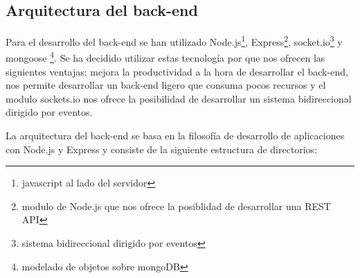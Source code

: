 \subsection{Arquitectura del back-end}


Para el desarrollo del back-end se han utilizado Node.js\footnote{javascript al lado del servidor}, Express\footnote{modulo de Node.js que nos ofrece la posiblidad de desarrollar una REST API}, socket.io\footnote{sistema bidireccional dirigido por eventos} y mongoose \footnote{modelado de objetos sobre mongoDB}. Se ha decidido utilizar estas tecnología por que nos ofrecen las siguientes ventajas: mejora la productividad a la hora de desarrollar el back-end, nos permite desarrollar un back-end ligero que consuma pocos recursos y el modulo sockets.io nos ofrece la posibilidad de desarrollar un sistema bidireccional dirigido por eventos.

La arquitectura del back-end se basa en la filosofía de desarrollo de aplicaciones con Node.js y Express y consiste de la siguiente estructura de directorios:


\newpage


